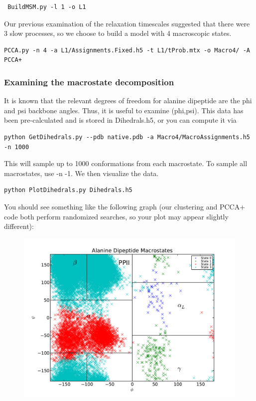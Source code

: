 \documentclass[12pt]{article}
\begin{document}
\begin{verbatim}
 BuildMSM.py -l 1 -o L1
\end{verbatim}

Our previous examination of the relaxation timescales suggested that there were 3 slow processes, so we choose to build a model with 4 macroscopic states.  

\begin{verbatim}
PCCA.py -n 4 -a L1/Assignments.Fixed.h5 -t L1/tProb.mtx -o Macro4/ -A PCCA+
\end{verbatim}

\subsubsection{Examining the macrostate decomposition}

It is known that the relevant degrees of freedom for alanine dipeptide are the phi and psi backbone angles.  Thus, it is useful to examine (phi,psi). This data has been pre-calculated and is stored in Dihedrals.h5, or you can compute it via

\begin{verbatim}
python GetDihedrals.py --pdb native.pdb -a Macro4/MacroAssignments.h5 -n 1000
\end{verbatim}

This will sample up to 1000 conformations from each macrostate. To sample all macrostates, use -n -1. We then visualize the data.

\begin{verbatim}
python PlotDihedrals.py Dihedrals.h5
\end{verbatim}

You should see something like the following graph (our clustering and PCCA+ code both perform randomized searches, so your plot may appear slightly different):
\begin{figure}
\begin{center}
\includegraphics[width=11.7cm]{figures/Macro4}
\end{center}
\end{figure}
\end{document}
